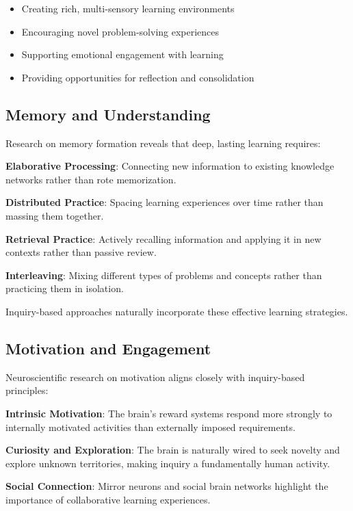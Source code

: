 \documentclass[
  Letterpaper,
]{scrbook}
\providecommand{\tightlist}{%
  \setlength{\itemsep}{0pt}\setlength{\parskip}{0pt}}\usepackage{longtable,booktabs,array}
\begin{document}
\begin{itemize}
\tightlist
\item
  Creating rich, multi-sensory learning environments
\item
  Encouraging novel problem-solving experiences
\item
  Supporting emotional engagement with learning
\item
  Providing opportunities for reflection and consolidation
\end{itemize}

\subsection{Memory and Understanding}\label{memory-and-understanding}

Research on memory formation reveals that deep, lasting learning
requires:

\textbf{Elaborative Processing}: Connecting new information to existing
knowledge networks rather than rote memorization.

\textbf{Distributed Practice}: Spacing learning experiences over time
rather than massing them together.

\textbf{Retrieval Practice}: Actively recalling information and applying
it in new contexts rather than passive review.

\textbf{Interleaving}: Mixing different types of problems and concepts
rather than practicing them in isolation.

Inquiry-based approaches naturally incorporate these effective learning
strategies.

\subsection{Motivation and Engagement}\label{motivation-and-engagement}

Neuroscientific research on motivation aligns closely with inquiry-based
principles:

\textbf{Intrinsic Motivation}: The brain's reward systems respond more
strongly to internally motivated activities than externally imposed
requirements.

\textbf{Curiosity and Exploration}: The brain is naturally wired to seek
novelty and explore unknown territories, making inquiry a fundamentally
human activity.

\textbf{Social Connection}: Mirror neurons and social brain networks
highlight the importance of collaborative learning experiences.
\end{document}
